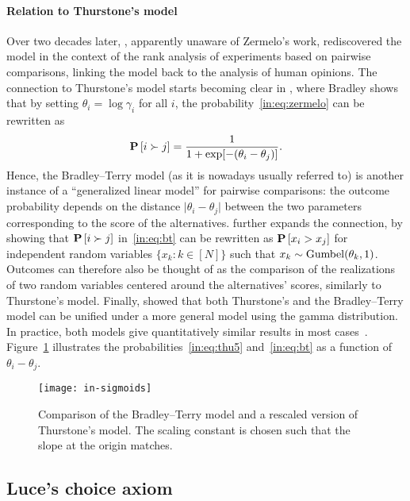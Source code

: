 \paragraph{Relation to Thurstone's model}
Over two decades later, \citet{bradley1952rank}, apparently unaware of Zermelo's work, rediscovered the model in the context of the rank analysis of experiments based on pairwise comparisons, linking the model back to the analysis of human opinions.
The connection to Thurstone's model starts becoming clear in \citet{bradley1953some}, where Bradley shows that by setting $\theta_i = \log \gamma_i$ for all $i$, the probability~\eqref{in:eq:zermelo} can be rewritten as
\begin{align}
\label{in:eq:bt}
\mathbf{P}\left[ i \succ j \right] = \frac{1}{1 + \exp[-(\theta_i - \theta_j)]}.
\end{align}
Hence, the Bradley--Terry model (as it is nowadays usually referred to) is another instance of a ``generalized linear model'' for pairwise comparisons: the outcome probability depends on the distance $\lvert \theta_i - \theta_j \rvert$ between the two parameters corresponding to the score of the alternatives.
\citet{yellot1977relationship} further expands the connection, by showing that $\mathbf{P}\left[ i \succ j \right]$ in~\eqref{in:eq:bt} can be rewritten as $\mathbf{P}\left[ x_i > x_j \right]$ for independent random variables $\{x_k : k \in [N]\}$ such that $x_k \sim \mathrm{Gumbel}( \theta_k, 1 )$.
Outcomes can therefore also be thought of as the comparison of the realizations of two random variables centered around the alternatives' scores, similarly to Thurstone's model.
Finally, \citet{stern1992all} showed that both Thurstone's and the Bradley--Terry model can be unified under a more general model using the gamma distribution.
In practice, both models give quantitatively similar results in most cases~\citep{tsukida2011how}.
Figure~\ref{in:fig:sigmoids} illustrates the probabilities~\eqref{in:eq:thu5} and~\eqref{in:eq:bt} as a function of $\theta_i - \theta_j$.

\begin{figure}[ht]
\centering
\texttt{[image: in-sigmoids]}
\caption{
Comparison of the Bradley--Terry model and a rescaled version of Thurstone's model.
The scaling constant is chosen such that the slope at the origin matches.
}
\label{in:fig:sigmoids}
\end{figure}


\subsection{Luce's choice axiom}

